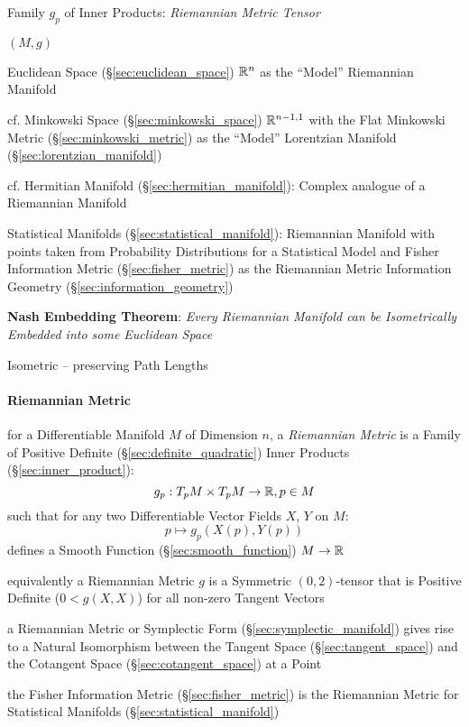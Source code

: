 Family $g_p$ of Inner Products: \emph{Riemannian Metric Tensor}

$(M,g)$

Euclidean Space (\S\ref{sec:euclidean_space}) $\mathbb{R}^n$ as the
``Model'' Riemannian Manifold

cf. Minkowski Space (\S\ref{sec:minkowski_space}) $\mathbb{R}^{n-1,1}$
with the Flat Minkowski Metric (\S\ref{sec:minkowski_metric}) as the
``Model'' Lorentzian Manifold (\S\ref{sec:lorentzian_manifold})

cf. Hermitian Manifold (\S\ref{sec:hermitian_manifold}): Complex
analogue of a Riemannian Manifold

\fist Statistical Manifolds (\S\ref{sec:statistical_manifold}):
Riemannian Manifold with points taken from Probability Distributions
for a Statistical Model and Fisher Information Metric
(\S\ref{sec:fisher_metric}) as the Riemannian Metric \fist Information Geometry
(\S\ref{sec:information_geometry})

\textbf{Nash Embedding Theorem}: \emph{Every Riemannian Manifold can be
  Isometrically Embedded into some Euclidean Space}

Isometric -- preserving Path Lengths



\paragraph{Riemannian Metric}\label{sec:riemannian_metric}\hfill

for a Differentiable Manifold $M$ of Dimension $n$, a \emph{Riemannian
  Metric} is a Family of Positive Definite
(\S\ref{sec:definite_quadratic}) Inner Products
(\S\ref{sec:inner_product}):
\[
  g_p : T_p M \times T_p M \rightarrow \mathbb{R}, p \in M
\]
such that for any two Differentiable Vector Fields $X$, $Y$ on $M$:
\[
  p \mapsto g_p (X(p), Y(p))
\]
defines a Smooth Function (\S\ref{sec:smooth_function}) $M \rightarrow
\mathbb{R}$

equivalently a Riemannian Metric $g$ is a Symmetric $(0,2)$-tensor
that is Positive Definite ($0 < g(X,X)$) for all non-zero Tangent
Vectors %

a Riemannian Metric or Symplectic Form (\S\ref{sec:symplectic_manifold}) gives
rise to a Natural Isomorphism between the Tangent Space
(\S\ref{sec:tangent_space}) and the Cotangent Space
(\S\ref{sec:cotangent_space}) at a Point

the Fisher Information Metric (\S\ref{sec:fisher_metric}) is the Riemannian
Metric for Statistical Manifolds (\S\ref{sec:statistical_manifold})



